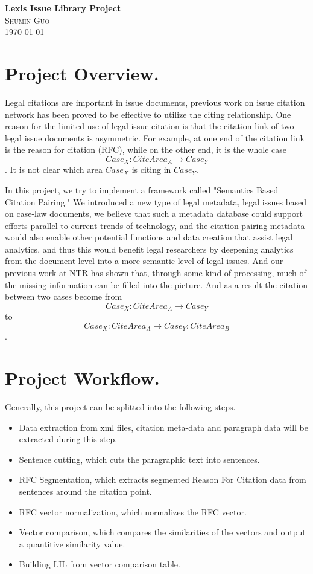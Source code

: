 \documentclass[12pt]{article}
\begin{document}
\begin{center}                  %
\textbf{\Large{Lexis Issue Library Project}} \\ 
\small\textsc{Shumin Guo} \\
\today
\end{center}

\section{Project Overview.}
Legal citations are important in issue documents, previous work on
issue citation network has been proved to be effective to utilize the
citing relationship. One reason for the limited use of legal issue
citation is that the citation link of two legal issue documents is
asymmetric. For example, at one end of the citation link is the reason
for citation (RFC), while on the other end, it is the whole case
\[
Case_X:CiteArea_A \rightarrow Case_Y
\]. It is not clear which area $Case_X$ is citing in $Case_Y$.

In this project, we try to implement a framework called "Semantics
Based Citation Pairing." We introduced a new type of legal metadata,
legal issues based on case-law documents, we believe that such a
metadata database could support efforts parallel to current trends of
technology, and the citation pairing metadata would also enable other
potential functions and data creation that assist legal analytics, and
thus this would benefit legal researchers by deepening analytics from
the document level into a more semantic level of legal issues. And our
previous work at NTR has shown that, through some kind of processing,
much of the missing information can be filled into the picture. And as
a result the citation between two cases become from 
\[
Case_X:CiteArea_A \rightarrow Case_Y
\]
 to
\[
Case_X:CiteArea_A \rightarrow Case_Y:CiteArea_B
\].

\section{Project Workflow.}
Generally, this project can be splitted into the following steps. 
\begin{itemize}
\item Data extraction from xml files, citation meta-data and paragraph
  data will be extracted during this step. 
\item Sentence cutting, which cuts the paragraphic text into
  sentences. 
\item RFC Segmentation, which extracts segmented Reason For Citation
  data from sentences around the citation point. 
\item RFC vector normalization, which normalizes the RFC vector. 
\item Vector comparison, which compares the similarities of the
  vectors and output a quantitive similarity value. 
\item Building LIL from vector comparison table. 
\end{itemize}
\end{document}
